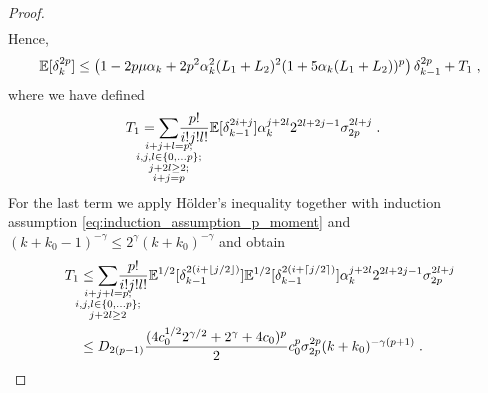\begin{proof}
\begin{align}
    \end{align}
    Hence, 
    \begin{align}
     \mathbb{E}[\delta_k^{2p}] \leq \left(1 -2p\mu\alpha_k + 2 p^2\alpha_k^2 (L_1+L_2)^2(1+5\alpha_k(L_1+L_2))^{p} \right)\delta_{k-1}^{2p} + T_1\;,
    \end{align}
    where we have defined 
    \begin{align}
    T_1 &= \underset{\mathclap{\substack{i+j+l=p;\\ i,j,l \in \{0,\ldots p\}; \\j+2l\geq 2;\\i+j=p }}} {\sum}\frac{p!}{i!j!l!} \PE[\delta_{k-1}^{2i+j}] \alpha_k^{j+2l}2^{2l+2j-1}\sigma_{2p}^{2l+j}\eqsp.
    \end{align}
    For the last term we apply H\"older's inequality together with  induction assumption \eqref{eq:induction_assumption_p_moment} and  $(k+k_0-1)^{-\gamma}\leq 2^{\gamma}(k+k_0)^{-\gamma}$ and obtain
    \begin{align}
    T_1 &\leq  \underset{\mathclap{\substack{i+j+l=p;\\ i,j,l \in \{0,\ldots p\}; \\j+2l\geq 2}}} {\sum}\frac{p!}{i!j!l!}\PE^{1/2}[\delta_{k-1}^{2(i+\lfloor j/2 \rfloor)}]\PE^{1/2}[\delta_{k-1}^{2(i+\lceil j/2 \rceil)}]\alpha_k^{j+2l}2^{2l+2j-1}\sigma_{2p}^{2l+j} \\
    & \leq D_{2(p-1)}\frac{(4c_0^{1/2}2^{\gamma/2}+2^{\gamma}+ 4c_0)^p}{2}c_0^p\sigma_{2p}^{2p}(k+k_0)^{-\gamma (p+1)}\eqsp.
    \end{align}

\end{proof}

